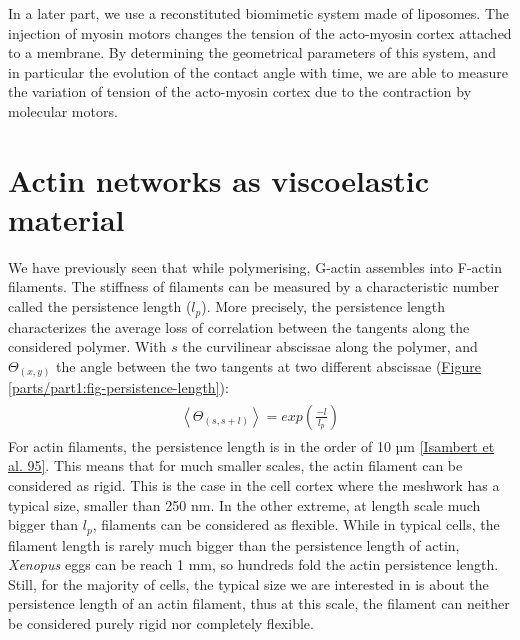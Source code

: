 \documentclass[A4paperpaper,11pt,english]{sphinxmanual}
\begin{document}
In a later part, we use a reconstituted biomimetic system made of liposomes. The
injection of myosin motors changes the tension of the acto-myosin cortex
attached to a membrane. By determining the geometrical parameters of this
system, and in particular the evolution of the contact angle with time, we are
able to measure the variation of tension of the acto-myosin cortex due to the contraction by
molecular motors.


\section{Actin networks as viscoelastic material}
\label{parts/part1:viscoelastic}\label{parts/part1:actin-networks-as-viscoelastic-material}
We have previously seen that while polymerising, G-actin assembles into F-actin
filaments. The stiffness of filaments can be measured by a characteristic number
called the persistence length (\(l_p\)). More precisely, the
persistence length characterizes the average loss of correlation between the
tangents along the considered polymer. With \(s\) the curvilinear abscissae along the polymer,
and \(\Theta_{(x,y)}\) the angle between the two tangents at two different abscissae (\hyperref[parts/part1:fig-persistence-length]{Figure  \ref*{parts/part1:fig-persistence-length}}):
\label{parts/part1:equation-eqa6}\begin{gather}
\begin{split}\left<\Theta_{(s,s+l)}\right> = exp\left(\frac{-l}{l_p}\right)\end{split}\label{parts/part1-eqa6}
\end{gather}
For actin filaments, the
persistence length is in the order of 10 µm {\hyperref[parts/part1:isambert1995]{{[}Isambert et al. 95{]}}}. This means
that for much smaller scales, the actin filament can be considered as rigid.
This is the case in the cell cortex where the meshwork has a typical size, smaller than 250 nm. In
the other extreme, at length scale much bigger than \(l_p\), filaments can
be considered as flexible. While in typical cells, the filament length is
rarely much bigger than the persistence length of actin, \emph{Xenopus} eggs can be
reach 1 mm, so hundreds fold the actin persistence length.
Still, for the majority of cells, the typical size we are interested in
is about the persistence length of an actin filament, thus at this scale, the filament can neither be considered purely
rigid nor completely flexible.
\end{document}
